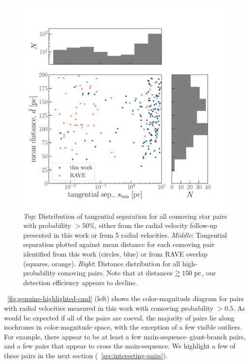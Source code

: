 \documentclass[modern, letterpaper]{aastex61}
\newcommand{\DR}[1]{\acronym{DR}#1}
\begin{document}
\begin{figure}[htb]
  \begin{center}
    \includegraphics[width=0.9\linewidth]{separation-with-rave.pdf}
  \end{center}
  \caption{%
    \emph{Top}: Distribution of tangential separation for all comoving star
      pairs with probability $>50\%$, either from the radial velocity follow-up
      presented in this work or from  \DR{5} radial velocities.
    \emph{Middle}: Tangential separation plotted against mean distance for each
      comoving pair identified from this work (circles, blue) or from RAVE
      overlap (squares, orange).
    \emph{Right}: Distance distribution for all high-probability comoving pairs.
      Note that at distances $\gtrsim 150~\mathrm{pc}$, our detection efficiency appears
      to decline.
    \label{fig:separation-scatter}}
\end{figure}

\figurename~\ref{fig:genuine-highlighted-cmd} (left) shows the color-magnitude
diagram for pairs with radial velocities measured in this work with comoving
probability $> 0.5$.
As would be expected if all of the pairs are coeval, the majority of pairs lie
along isochrones in color-magnitude space, with the exception of a few visible
outliers.
For example, there appear to be at least a few main-sequence--giant-branch
pairs, and a few pairs that appear to cross the main-sequence.
We highlight a few of these pairs in the next section
(\sectionname~\ref{sec:interesting-pairs}).
\end{document}
